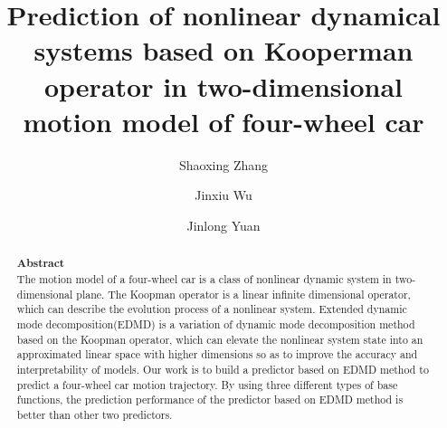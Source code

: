 \documentclass[12pt]{llncs}
\begin{document}
\fi

\title{Prediction of nonlinear dynamical systems based on Kooperman operator in two-dimensional motion model of four-wheel car}
%
%
\author{Shaoxing Zhang \and Jinxiu Wu \and Jinlong Yuan}
%
%
%

\maketitle              %

\begin{abstract}
\noindent\textbf{Abstract}\\
The motion model of a four-wheel car is a class of nonlinear dynamic system in two-dimensional plane. The Koopman operator is a linear infinite dimensional operator, which can describe the evolution process of a nonlinear system. Extended dynamic mode decomposition(EDMD) is a variation of dynamic mode decomposition method based on the Koopman operator, which can elevate the nonlinear system state into an approximated linear space with higher dimensions so as to improve the accuracy and interpretability of models. Our work is to build a predictor based on EDMD method to predict a four-wheel car motion trajectory. By using three different types of base functions, the prediction performance of the predictor based on EDMD method is better than other two predictors.
\end{abstract}
\end{document}
